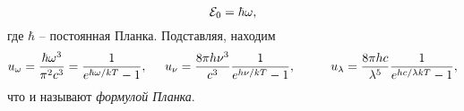 \begin{equation*}
    \mathcal E_0 = \hbar \omega,
\end{equation*}
где $\hbar$ -- постоянная Планка. Подставляя, находим
\begin{equation}
    u_\omega = \frac{\hbar \omega^3}{\pi^2 c^3} = \frac{1}{e^{\hbar \omega /  kT} - 1},
    \hspace{5 mm} 
    u_\nu = \frac{8 \pi h \nu^3}{c^3} \frac{1}{e^{h \nu / kT}-1},
    \hspace{10 mm} 
    u_\lambda = \frac{8 \pi h c}{\lambda^5} \frac{1}{e^{h c / \lambda k T} - 1},
\end{equation}
что и называют \textit{формулой Планка}.



